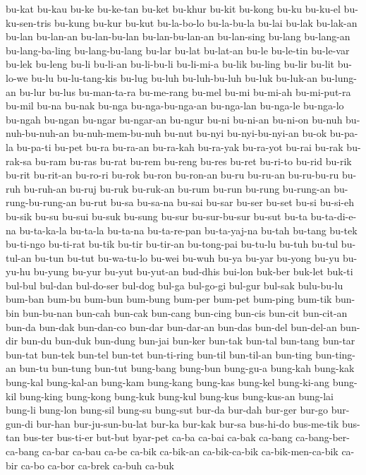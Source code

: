 {bu-kat bu-kau bu-ke bu-ke-tan bu-ket bu-khur bu-kit bu-kong bu-ku bu-ku-el
bu-ku-sen-tris bu-kung bu-kur bu-kut bu-la-bo-lo bu-la-bu-la bu-lai bu-lak
bu-lak-an bu-lan bu-lan-an bu-lan-bu-lan bu-lan-bu-lan-an bu-lan-sing
bu-lang bu-lang-an bu-lang-ba-ling bu-lang-bu-lang bu-lar bu-lat bu-lat-an
bu-le bu-le-tin bu-le-var bu-lek bu-leng bu-li bu-li-an bu-li-bu-li
bu-li-mi-a bu-lik bu-ling bu-lir bu-lit bu-lo-we bu-lu bu-lu-tang-kis
bu-lug bu-luh bu-luh-bu-luh bu-luk bu-luk-an bu-lung-an bu-lur bu-lus
bu-man-ta-ra bu-me-rang bu-mel bu-mi bu-mi-ah bu-mi-put-ra bu-mil bu-na
bu-nak bu-nga bu-nga-bu-nga-an bu-nga-lan bu-nga-le bu-nga-lo bu-ngah
bu-ngan bu-ngar bu-ngar-an bu-ngur bu-ni bu-ni-an bu-ni-on bu-nuh
bu-nuh-bu-nuh-an bu-nuh-mem-bu-nuh bu-nut bu-nyi bu-nyi-bu-nyi-an bu-ok
bu-pa-la bu-pa-ti bu-pet bu-ra bu-ra-an bu-ra-kah bu-ra-yak bu-ra-yot
bu-rai bu-rak bu-rak-sa bu-ram bu-ras bu-rat bu-rem bu-reng bu-res bu-ret
bu-ri-to bu-rid bu-rik bu-rit bu-rit-an bu-ro-ri bu-rok bu-ron bu-ron-an
bu-ru bu-ru-an bu-ru-bu-ru bu-ruh bu-ruh-an bu-ruj bu-ruk bu-ruk-an bu-rum
bu-run bu-rung bu-rung-an bu-rung-bu-rung-an bu-rut bu-sa bu-sa-na bu-sai
bu-sar bu-ser bu-set bu-si bu-si-eh bu-sik bu-su bu-sui bu-suk bu-sung
bu-sur bu-sur-bu-sur bu-sut bu-ta bu-ta-di-e-na bu-ta-ka-la bu-ta-la
bu-ta-na bu-ta-re-pan bu-ta-yaj-na bu-tah bu-tang bu-tek bu-ti-ngo
bu-ti-rat bu-tik bu-tir bu-tir-an bu-tong-pai bu-tu-lu bu-tuh bu-tul
bu-tul-an bu-tun bu-tut bu-wa-tu-lo bu-wei bu-wuh bu-ya bu-yar bu-yong
bu-yu bu-yu-hu bu-yung bu-yur bu-yut bu-yut-an bud-dhis bui-lon buk-ber
buk-let buk-ti bul-bul bul-dan bul-do-ser bul-dog bul-ga bul-go-gi bul-gur
bul-sak bulu-bu-lu bum-ban bum-bu bum-bun bum-bung bum-per bum-pet
bum-ping bum-tik bun-bin bun-bu-nan bun-cah bun-cak bun-cang bun-cing
bun-cis bun-cit bun-cit-an bun-da bun-dak bun-dan-co bun-dar bun-dar-an
bun-das bun-del bun-del-an bun-dir bun-du bun-duk bun-dung bun-jai bun-ker
bun-tak bun-tal bun-tang bun-tar bun-tat bun-tek bun-tel bun-tet
bun-ti-ring bun-til bun-til-an bun-ting bun-ting-an bun-tu bun-tung
bun-tut bung-bang bung-bun bung-gu-a bung-kah bung-kak bung-kal
bung-kal-an bung-kam bung-kang bung-kas bung-kel bung-ki-ang bung-kil
bung-king bung-kong bung-kuk bung-kul bung-kus bung-kus-an bung-lai
bung-li bung-lon bung-sil bung-su bung-sut bur-da bur-dah bur-ger bur-go
bur-gun-di bur-han bur-ju-sun-bu-lat bur-ka bur-kak bur-sa bus-hi-do
bus-me-tik bus-tan bus-ter bus-ti-er but-but byar-pet ca-ba ca-bai ca-bak
ca-bang ca-bang-ber-ca-bang ca-bar ca-bau ca-be ca-bik ca-bik-an
ca-bik-ca-bik ca-bik-men-ca-bik ca-bir ca-bo ca-bor ca-brek ca-buh ca-buk
}
